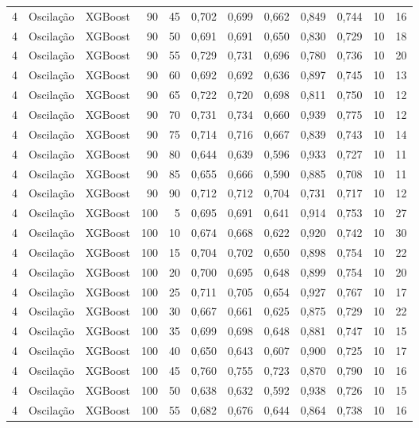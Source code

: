 \begin{longtable}{@{}rllrrrrrrrrr@{}}
4 & Oscilação & XGBoost & 90 & 45 & 0,702 & 0,699 & 0,662 & 0,849 & 0,744 & 10 & 16 \\
4 & Oscilação & XGBoost & 90 & 50 & 0,691 & 0,691 & 0,650 & 0,830 & 0,729 & 10 & 18 \\
4 & Oscilação & XGBoost & 90 & 55 & 0,729 & 0,731 & 0,696 & 0,780 & 0,736 & 10 & 20 \\
4 & Oscilação & XGBoost & 90 & 60 & 0,692 & 0,692 & 0,636 & 0,897 & 0,745 & 10 & 13 \\
4 & Oscilação & XGBoost & 90 & 65 & 0,722 & 0,720 & 0,698 & 0,811 & 0,750 & 10 & 12 \\
4 & Oscilação & XGBoost & 90 & 70 & 0,731 & 0,734 & 0,660 & 0,939 & 0,775 & 10 & 12 \\
4 & Oscilação & XGBoost & 90 & 75 & 0,714 & 0,716 & 0,667 & 0,839 & 0,743 & 10 & 14 \\
4 & Oscilação & XGBoost & 90 & 80 & 0,644 & 0,639 & 0,596 & 0,933 & 0,727 & 10 & 11 \\
4 & Oscilação & XGBoost & 90 & 85 & 0,655 & 0,666 & 0,590 & 0,885 & 0,708 & 10 & 11 \\
4 & Oscilação & XGBoost & 90 & 90 & 0,712 & 0,712 & 0,704 & 0,731 & 0,717 & 10 & 12 \\
4 & Oscilação & XGBoost & 100 & 5 & 0,695 & 0,691 & 0,641 & 0,914 & 0,753 & 10 & 27 \\
4 & Oscilação & XGBoost & 100 & 10 & 0,674 & 0,668 & 0,622 & 0,920 & 0,742 & 10 & 30 \\
4 & Oscilação & XGBoost & 100 & 15 & 0,704 & 0,702 & 0,650 & 0,898 & 0,754 & 10 & 22 \\
4 & Oscilação & XGBoost & 100 & 20 & 0,700 & 0,695 & 0,648 & 0,899 & 0,754 & 10 & 20 \\
4 & Oscilação & XGBoost & 100 & 25 & 0,711 & 0,705 & 0,654 & 0,927 & 0,767 & 10 & 17 \\
4 & Oscilação & XGBoost & 100 & 30 & 0,667 & 0,661 & 0,625 & 0,875 & 0,729 & 10 & 22 \\
4 & Oscilação & XGBoost & 100 & 35 & 0,699 & 0,698 & 0,648 & 0,881 & 0,747 & 10 & 15 \\
4 & Oscilação & XGBoost & 100 & 40 & 0,650 & 0,643 & 0,607 & 0,900 & 0,725 & 10 & 17 \\
4 & Oscilação & XGBoost & 100 & 45 & 0,760 & 0,755 & 0,723 & 0,870 & 0,790 & 10 & 16 \\
4 & Oscilação & XGBoost & 100 & 50 & 0,638 & 0,632 & 0,592 & 0,938 & 0,726 & 10 & 15 \\
4 & Oscilação & XGBoost & 100 & 55 & 0,682 & 0,676 & 0,644 & 0,864 & 0,738 & 10 & 16 \\

\end{longtable}
